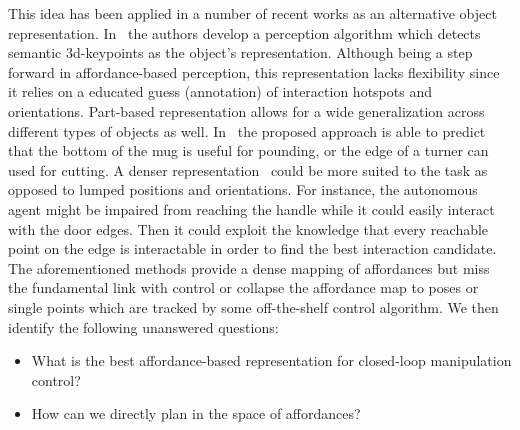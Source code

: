 This idea has been applied in a number of recent works as an alternative object representation. 
In~\cite{gao2021kpam} the authors develop a perception algorithm which detects semantic 3d-keypoints as the object's representation. Although being a step forward in affordance-based perception, this representation lacks flexibility since it relies on a educated guess (annotation) of interaction hotspots and orientations. Part-based representation allows for a wide generalization across different types of objects as well. In~\cite{myers2015affordance} the proposed approach is able to predict that the bottom of the mug is useful for pounding, or the edge of a turner can used for cutting. A denser representation~\cite{nagarajan2019grounded, mo2021where2act} could be more suited to the task as opposed to lumped positions and orientations. For instance, the autonomous agent might be impaired from reaching the handle while it could easily interact with the door edges. Then it could exploit the knowledge that every reachable point on the edge is interactable in order to find the best interaction candidate. The aforementioned methods provide a dense mapping of affordances but miss the fundamental link with control or collapse the affordance map to poses or single points which are tracked by some off-the-shelf control algorithm. 
We then identify the following unanswered questions:
\begin{itemize}
\item What is the best affordance-based representation for closed-loop manipulation control? 
\item How can we directly plan in the space of affordances?
\end{itemize} 
 
